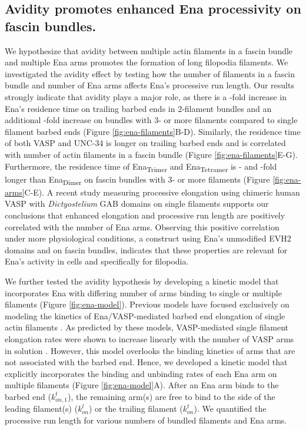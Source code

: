 \subsection{Avidity promotes enhanced Ena processivity on fascin bundles.}\label{avidity-processivity}

We hypothesize that avidity between multiple actin filaments in a fascin bundle and multiple Ena arms promotes the formation of long filopodia filaments. We investigated the avidity effect by testing how the number of filaments in a fascin bundle and number of Ena arms affects Ena's processive run length. Our results strongly indicate that avidity plays a major role, as there is a -fold increase in Ena's residence time on trailing barbed ends in 2-filament bundles and an additional -fold increase on bundles with 3- or more filaments compared to single filament barbed ends (Figure \ref{fig:ena-filaments}B-D). Similarly, the residence time of both VASP and UNC-34 is longer on trailing barbed ends and is correlated with number of actin filaments in a fascin bundle (Figure \ref{fig:ena-filaments}E-G). Furthermore, the residence time of Ena\textsubscript{Trimer} and Ena\textsubscript{Tetramer} is - and -fold longer than Ena\textsubscript{Dimer} on fascin bundles with 3- or more filaments (Figure \ref{fig:ena-arms}C-E). A recent study measuring processive elongation using chimeric human VASP with \textit{Dictyostelium} GAB domains on single filaments \citep{bruhmann_distinct_2017} supports our conclusions that enhanced elongation and processive run length are positively correlated with the number of Ena arms. Observing this positive correlation under more physiological conditions, a construct using Ena's unmodified EVH2 domains and on fascin bundles, indicates that these properties are relevant for Ena's activity in cells and specifically for filopodia. 

We further tested the avidity hypothesis by developing a kinetic model that incorporates Ena with differing number of arms binding to single or multiple filaments (Figure \ref{fig:ena-model}). Previous models have focused exclusively on modeling the kinetics of Ena/VASP-mediated barbed end elongation of single actin filaments \citep{hansen_vasp_2010, breitsprecher_molecular_2011, bruhmann_distinct_2017}. As predicted by these models, VASP-mediated single filament elongation rates were shown to increase linearly with the number of VASP arms in solution \citep{breitsprecher_molecular_2011}. However, this model overlooks the binding kinetics of arms that are not associated with the barbed end. Hence, we developed a kinetic model that explicitly incorporates the binding and unbinding rates of each Ena arm on multiple filaments (Figure \ref{fig:ena-model}A). After an Ena arm binds to the barbed end ($k_{on,1}^{t}$), the remaining arm(s) are free to bind to the side of the leading filament(s) ($k_{on}^{l}$) or the trailing filament ($k_{on}^{t}$). We quantified the processive run length for various numbers of bundled filaments and Ena arms. 

